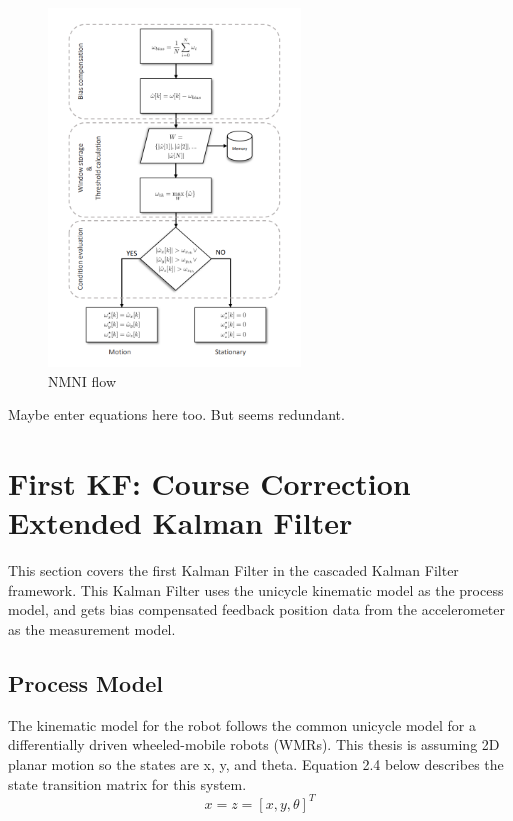 \begin{figure}
  \centerline{\includegraphics[height=95mm]{temp_NMNI.PNG}}
  \caption[NMNI Flow]{
    NMNI flow
    }
  \label{fig:NMNI}
\end{figure}

Maybe enter equations here too. But seems redundant.


\section{First KF: Course Correction Extended Kalman Filter}

This section covers the first Kalman Filter in the cascaded Kalman Filter framework.
This Kalman Filter uses the unicycle kinematic model as the process model, and gets
bias compensated feedback position data from the accelerometer as the measurement 
model. 

\subsection{Process Model}

The kinematic model for the robot follows the common unicycle model for a 
differentially driven wheeled-mobile robots (WMRs). This thesis is assuming 2D planar 
motion so the states are x, y, and theta. Equation 2.4 below describes the state 
transition matrix for this system. 
\\
\begin{equation}
  x = z = [x, y, \theta]^T
\end{equation}

